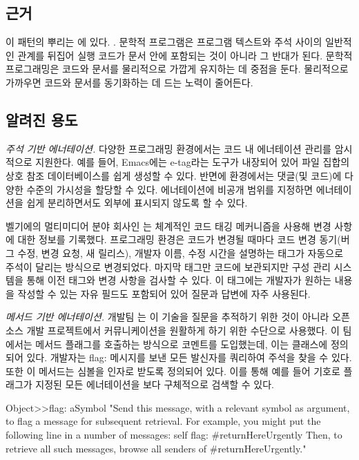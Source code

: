 \documentclass[a4paper,10pt,twoside]{book}
\begin{document}
\subsection*{근거}

이 패턴의 뿌리는 에 있다. \cite{Reen89a}\cite{Knut92a}. 문학적 프로그램은 프로그램 텍스트와 주석 사이의 일반적인 관계를 뒤집어 실행 코드가 문서 안에 포함되는 것이 아니라 그 반대가 된다. 문학적 프로그래밍은 코드와 문서를 물리적으로 가깝게 유지하는 데 중점을 둔다. 물리적으로 가까우면 코드와 문서를 동기화하는 데 드는 노력이 줄어든다.

\subsection*{알려진 용도}

\emph{주석 기반 에너테이션.}
다양한 프로그래밍 환경에서는 코드 내 에너테이션 관리를 암시적으로 지원한다. 예를 들어, Emacs에는 e-tag라는 도구가 내장되어 있어 \cite{Came96a} 파일 집합의 상호 참조 데이터베이스를 쉽게 생성할 수 있다. 반면에  환경에서는 댓글(및 코드)에 다양한 수준의 가시성을 할당할 수 있다. 에너테이션에 비공개 범위를 지정하면 에너테이션을 쉽게 분리하면서도 외부에 표시되지 않도록 할 수 있다.

벨기에의 멀티미디어 분야 회사인 는 체계적인 코드 태깅 메커니즘을 사용해 변경 사항에 대한 정보를 기록했다. 프로그래밍 환경은 코드가 변경될 때마다 코드 변경 동기(버그 수정, 변경 요청, 새 릴리스), 개발자 이름, 수정 시간을 설명하는 태그가 자동으로 주석이 달리는 방식으로 변경되었다. 마지막 태그만 코드에 보관되지만 구성 관리 시스템을 통해 이전 태그와 변경 사항을 검사할 수 있다. 이 태그에는 개발자가 원하는 내용을 작성할 수 있는 자유 필드도 포함되어 있어 질문과 답변에 자주 사용된다. 

\noindent
\emph{메서드 기반 에너테이션.}
 개발팀 \cite{Inga97a}는 이 기술을 질문을 추적하기 위한 것이 아니라 오픈소스 개발 프로젝트에서 커뮤니케이션을 원활하게 하기 위한 수단으로 사용했다. 이 팀에서는 메서드 플래그를 호출하는 방식으로 코멘트를 도입했는데, 이는  클래스에 정의되어 있다. 개발자는 flag: 메시지를 보낸 모든 발신자를 쿼리하여 주석을 찾을 수 있다. 또한 이 메서드는 심볼을 인자로 받도록 정의되어 있다. 이를 통해 예를 들어  기호로 플래그가 지정된 모든 에너테이션을 보다 구체적으로 검색할 수 있다.

\begin{code}
Object>>flag: aSymbol
	"Send this message, with a relevant symbol as argument, to flag
	a message for subsequent retrieval. For example, you might put 
	the following line in a number of messages:
		self flag: #returnHereUrgently
	Then, to retrieve all such messages, browse all senders of
	#returnHereUrgently."
\end{code}
\end{document}
